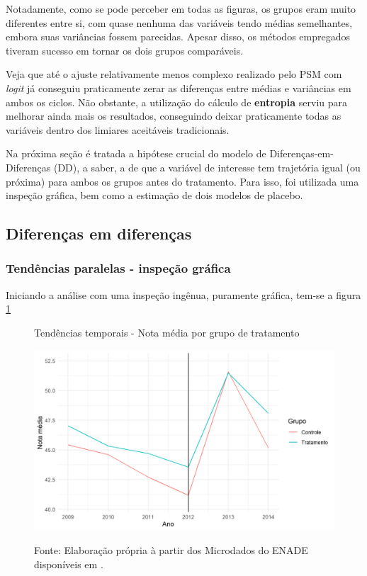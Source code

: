 Notadamente, como se pode perceber em todas as figuras, os grupos eram muito diferentes entre si, com quase nenhuma das variáveis tendo médias semelhantes, embora suas variâncias fossem parecidas. Apesar disso, os métodos empregados tiveram sucesso em tornar os dois grupos comparáveis.

Veja que até o ajuste relativamente menos complexo realizado pelo PSM com \textit{logit} já conseguiu praticamente zerar as diferenças entre médias e variâncias em ambos os ciclos. Não obstante, a utilização do cálculo de \textbf{entropia} serviu para melhorar ainda mais os resultados, conseguindo deixar praticamente todas as variáveis dentro dos limiares aceitáveis tradicionais.

Na próxima seção é tratada a hipótese crucial do modelo de Diferenças-em-Diferenças (DD), a saber, a de que a variável de interesse tem trajetória igual (ou próxima) para ambos os grupos antes do tratamento. Para isso, foi utilizada uma inspeção gráfica, bem como a estimação de dois modelos de placebo. 

\subsection{Diferenças em diferenças}

\subsubsection{Tendências paralelas - inspeção gráfica}

Iniciando a análise com uma inspeção ingênua, puramente gráfica, tem-se a figura \ref{fig:tendencias}

\begin{figure}[H]
	\centering
	\caption{Tendências temporais - Nota média por grupo de tratamento}
	\label{fig:tendencias}
	\includegraphics[width=0.7\linewidth]{"Figuras/tendencias.png"} \\
	\caption*{\RaggedRight Fonte: Elaboração própria à partir dos Microdados do ENADE disponíveis em \cite{INEP2020}.}
\end{figure}

